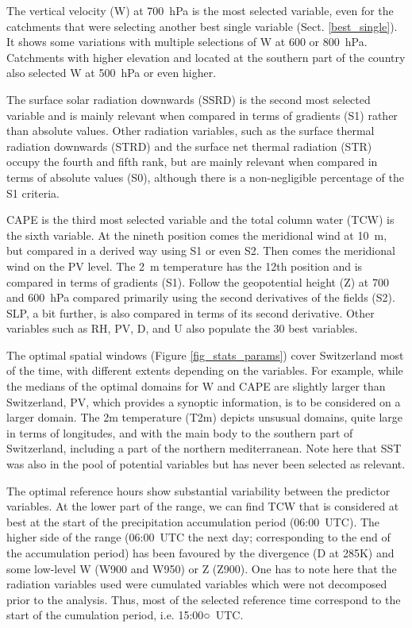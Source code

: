 \documentclass[draft]{agujournal2019}
\begin{document}
The vertical velocity (W) at 700~hPa is the most selected variable, even for the catchments that were selecting another best single variable (Sect. \ref{best_single}). It shows some variations with multiple selections of W at 600 or 800~hPa. Catchments with higher elevation and located at the southern part of the country also selected W at 500~hPa or even higher.

The surface solar radiation downwards (SSRD) is the second most selected variable and is mainly relevant when compared in terms of gradients (S1) rather than absolute values. Other radiation variables, such as the surface thermal radiation downwards (STRD) and the surface net thermal radiation (STR) occupy the fourth and fifth rank, but are mainly relevant when compared in terms of absolute values (S0), although there is a non-negligible percentage of the S1 criteria.

CAPE is the third most selected variable and the total column water (TCW) is the sixth variable. At the nineth position comes the meridional wind at 10~m, but compared in a derived way using S1 or even S2. Then comes the meridional wind on the PV level. The 2~m temperature has the 12th position and is compared in terms of gradients (S1). Follow the geopotential height (Z) at 700 and 600~hPa compared primarily using the second derivatives of the fields (S2). SLP, a bit further, is also compared in terms of its second derivative. Other variables such as RH, PV, D, and U also populate the 30 best variables.

The optimal spatial windows (Figure \ref{fig_stats_params}) cover Switzerland most of the time, with different extents depending on the variables. For example, while the medians of the optimal domains for W and CAPE are slightly larger than Switzerland, PV, which provides a synoptic information, is to be considered on a larger domain. The 2m temperature (T2m) depicts unsusual domains, quite large in terms of longitudes, and with the main body to the southern part of Switzerland, including a part of the northern mediterranean. Note here that SST was also in the pool of potential variables but has never been selected as relevant.

The optimal reference hours show substantial variability between the predictor variables. At the lower part of the range, we can find TCW that is considered at best at the start of the precipitation accumulation period (06:00~UTC). The higher side of the range (06:00~UTC the next day; corresponding to the end of the accumulation period) has been favoured by the divergence (D at 285\degree K) and some low-level W (W900 and W950) or Z (Z900). One has to note here that the radiation variables used were cumulated variables which were not decomposed prior to the analysis. Thus, most of the selected reference time correspond to the start of the cumulation period, i.e. 15:00○~UTC.
\end{document}

